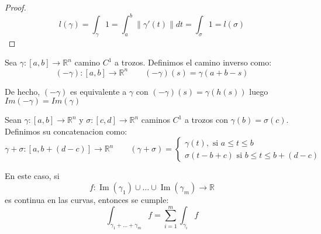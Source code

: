 \begin{proof}
    $$l(\gamma) =\int_{\gamma}1=\int_{a}^{b} \lVert \gamma'(t) \rVert dt=\int_{\sigma}1=l(\sigma)$$
\end{proof}

\begin{definición} 
Sea $\gamma:[a,b] \to \mathbb{R}^n$ camino $C^1$ a trozos. Definimos el camino inverso como:
$$(-\gamma):[a,b] \to \mathbb{R}^n \qquad (-\gamma)(s)=\gamma(a+b-s)$$
\end{definición}

\begin{observación}
De hecho, $(-\gamma)$ es equivalente a $\gamma$ con $(-\gamma)(s)=\gamma(h(s))$ luego $Im(-\gamma)=Im(\gamma)$
\end{observación}

\begin{definición}
Sean $\gamma:[a,b] \to \mathbb{R}^n$ y $\sigma:[c,d] \to \mathbb{R}^n$ caminos $C^1$ a trozos con $\gamma(b)=\sigma(c)$. Definimos su concatenacion como:\\
$$\gamma + \sigma:[a,b+(d-c)] \to \mathbb{R}^n \qquad (\gamma + \sigma) = \begin{cases}
        \gamma(t), \text{ si } a \leq t \leq b \\
        \sigma(t - b + c) \text{ si } b\leq t \leq b+(d-c)
    \end{cases}$$
\end{definición}

\begin{observación}
En este caso, si
\[
    f : \operatorname{Im}(\gamma_1) \cup \dots \cup \operatorname{Im}(\gamma_m) \longrightarrow \mathbb{R}
\]
es continua en las curvas, entonces se cumple:
\[
    \int_{\gamma_1 + \dots + \gamma_m} f = \sum_{i=1}^{m} \int_{\gamma_i} f
\]
\end{observación}


